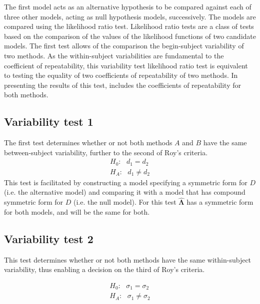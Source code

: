 \documentclass[12pt, a4paper]{report}
\theoremstyle{plain}
\theoremstyle{definition}
\theoremstyle{remark}
\begin{document}
	
	
	
	The first model acts as an alternative hypothesis to be compared against each of three other models, acting as null hypothesis models, successively. The models are compared using the likelihood ratio test. Likelihood ratio tests are a class of tests based on the comparison of the values of the likelihood functions of two candidate models. 
	The first test allows of the comparison the begin-subject variability of two methods. As the within-subject variabilities are fundamental to the coefficient of repeatability, this variability test likelihood ratio test is equivalent to testing the equality of two coefficients of repeatability of two methods. In presenting the results of this test, \citet{ARoy2009} includes the coefficients of repeatability for both methods.
	
	
	
	
	
	
	
	
	
	\subsection{Variability test 1}
	The first test determines whether or not both methods $A$ and $B$ have the same between-subject variability, further to the second of Roy's criteria.
	\begin{eqnarray*}
		H_{0}: \mbox{ }d_{1}  = d_{2} \\
		H_{A}: \mbox{ }d_{1}  \neq d_{2}
	\end{eqnarray*}
	This test is facilitated by constructing a model specifying a symmetric form for $D$ (i.e. the alternative model) and comparing it with a model that has compound symmetric form for $D$ (i.e. the null model). For this test $\boldsymbol{\hat{\Lambda}}$ has a symmetric form for both models, and will be the same for both.
	
	
	
	\subsection{Variability test 2}
	
	This test determines whether or not both methods have the same within-subject variability, thus enabling a decision on the third of Roy's criteria.
	
	\begin{eqnarray*}
		H_{0}: \mbox{ }\sigma_{1}  = \sigma_{2} \\
		H_{A}: \mbox{ }\sigma_{1}  \neq \sigma_{2}
	\end{eqnarray*}
	
\end{document}
